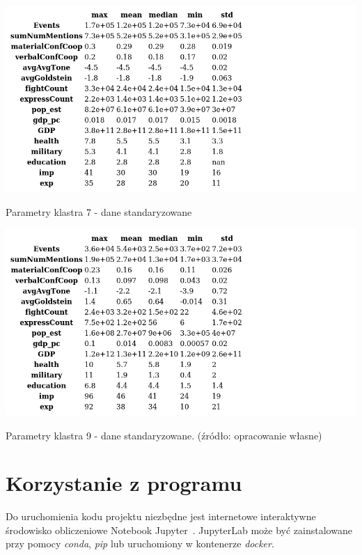 \documentclass[11pt]{report}
\begin{document}
    \begin{table}[!htp]
        \centering
        \includegraphics[width=\linewidth]{tables/CLUST/desc/clust7std_desc.png}
        \caption{Parametry klastra 7 - dane standaryzowane}
        \label{tab:cl7std_desc}
    \end{table}

    \begin{table}[!htp]
        \centering
        \includegraphics[width=\linewidth]{tables/CLUST/desc/clust9std_desc.png}
        \caption{Parametry klastra 9 - dane standaryzowane. (źródło: opracowanie własne)}
        \label{tab:cl9std_desc}
    \end{table}


    \chapter{Korzystanie z programu}\label{ch:korzystanie-z-programu}
    Do uruchomienia kodu projektu niezbędne jest internetowe interaktywne środowisko obliczeniowe Notebook Jupyter~\cite{jupyter}.
    JupyterLab może być zainstalowane przy pomocy \textit{conda}, \textit{pip} lub uruchomiony w kontenerze \textit{docker}.
\end{document}
